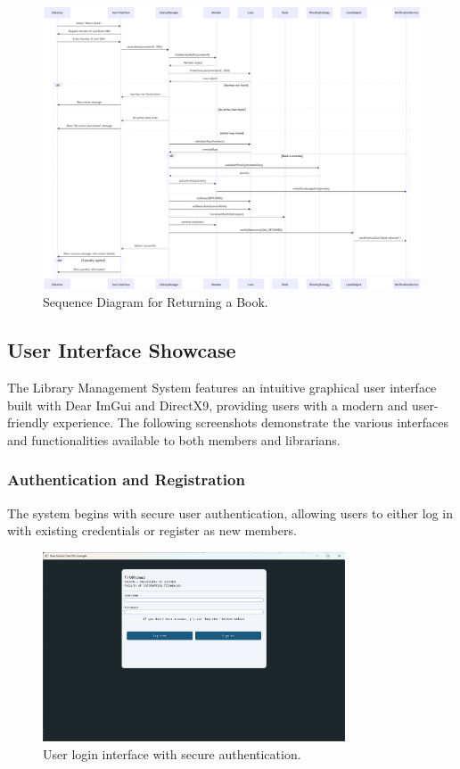 \begin{figure}[H]
	\centering
	\includegraphics[width=\textwidth]{figures/sequence_return.png}
	\caption{Sequence Diagram for Returning a Book.}
	\label{fig:seq_return}
\end{figure}

\newpage

\subsection{User Interface Showcase}
The Library Management System features an intuitive graphical user interface built with Dear ImGui and DirectX9, providing users with a modern and user-friendly experience. The following screenshots demonstrate the various interfaces and functionalities available to both members and librarians.

\subsubsection{Authentication and Registration}
The system begins with secure user authentication, allowing users to either log in with existing credentials or register as new members.

\begin{figure}[H]
	\centering
	\includegraphics[width=0.8\textwidth]{figures/screenshot_login.png}
	\caption{User login interface with secure authentication.}
	\label{fig:ss_login}
\end{figure}

